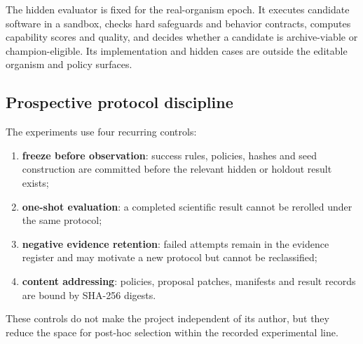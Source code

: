 The hidden evaluator is fixed for the real-organism epoch. It executes candidate software in a sandbox, checks hard safeguards and behavior contracts, computes capability scores and quality, and decides whether a candidate is archive-viable or champion-eligible. Its implementation and hidden cases are outside the editable organism and policy surfaces.

\subsection{Prospective protocol discipline}

The experiments use four recurring controls:
\begin{enumerate}
  \item \textbf{freeze before observation}: success rules, policies, hashes and seed construction are committed before the relevant hidden or holdout result exists;
  \item \textbf{one-shot evaluation}: a completed scientific result cannot be rerolled under the same protocol;
  \item \textbf{negative evidence retention}: failed attempts remain in the evidence register and may motivate a new protocol but cannot be reclassified;
  \item \textbf{content addressing}: policies, proposal patches, manifests and result records are bound by SHA-256 digests.
\end{enumerate}
These controls do not make the project independent of its author, but they reduce the space for post-hoc selection within the recorded experimental line.
